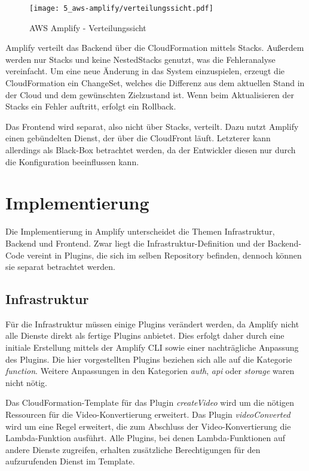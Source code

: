 \begin{figure}
  \centering
  \texttt{[image: 5\_aws-amplify/verteilungssicht.pdf]}
  \caption{AWS Amplify - Verteilungssicht}
  \label{Amplify:verteilungssicht}
\end{figure}

Amplify verteilt das Backend über die CloudFormation mittels Stacks. Außerdem werden nur Stacks und keine NestedStacks genutzt, was die Fehleranalyse vereinfacht. Um eine neue Änderung in das System einzuspielen, erzeugt die CloudFormation ein ChangeSet, welches die Differenz aus dem aktuellen Stand in der Cloud und dem gewünschten Zielzustand ist. Wenn beim Aktualisieren der Stacks ein Fehler auftritt, erfolgt ein Rollback.

Das Frontend wird separat, also nicht über Stacks, verteilt. Dazu nutzt Amplify einen gebündelten Dienst, der über die CloudFront läuft. Letzterer kann allerdings als Black-Box betrachtet werden, da der Entwickler diesen nur durch die Konfiguration beeinflussen kann.

\section{Implementierung}

Die Implementierung in Amplify unterscheidet die Themen Infrastruktur, Backend und Frontend. Zwar liegt die Infrastruktur-Definition und der Backend-Code vereint in Plugins, die sich im selben Repository befinden, dennoch können sie separat betrachtet werden.

\subsection{Infrastruktur}

Für die Infrastruktur müssen einige Plugins verändert werden, da Amplify nicht alle Dienste direkt als fertige Plugins anbietet. Dies erfolgt daher durch eine initiale Erstellung mittels der Amplify CLI sowie einer nachträgliche Anpassung des Plugins. Die hier vorgestellten Plugins beziehen sich alle auf die Kategorie \textit{function}. Weitere Anpassungen in den Kategorien \textit{auth}, \textit{api} oder \textit{storage} waren nicht nötig.

Das CloudFormation-Template für das Plugin \textit{createVideo} wird um die nötigen Ressourcen für die Video-Konvertierung erweitert. Das Plugin \textit{videoConverted} wird um eine Regel erweitert, die zum Abschluss der Video-Konvertierung die Lambda-Funktion ausführt. Alle Plugins, bei denen Lambda-Funktionen auf andere Dienste zugreifen, erhalten zusätzliche Berechtigungen für den aufzurufenden Dienst im Template.

